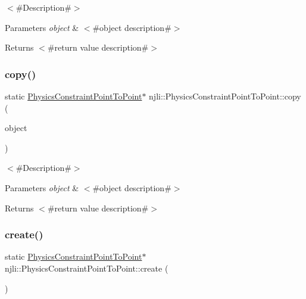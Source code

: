 $<$\#\+Description\#$>$


\begin{DoxyParams}{Parameters}
{\em object} & $<$\#object description\#$>$\\
\hline
\end{DoxyParams}
\begin{DoxyReturn}{Returns}
$<$\#return value description\#$>$ 
\end{DoxyReturn}
\mbox{\label{classnjli_1_1_physics_constraint_point_to_point_abcabf8d381d2c8c7adc66b3ad6a4eb08}} 
\subsubsection{\texorpdfstring{copy()}{copy()}}
{\footnotesize\ttfamily static \mbox{\hyperlink{classnjli_1_1_physics_constraint_point_to_point}{Physics\+Constraint\+Point\+To\+Point}}$\ast$ njli\+::\+Physics\+Constraint\+Point\+To\+Point\+::copy (\begin{DoxyParamCaption}\item[{const \mbox{\hyperlink{classnjli_1_1_physics_constraint_point_to_point}{Physics\+Constraint\+Point\+To\+Point}} \&}]{object }\end{DoxyParamCaption})\hspace{0.3cm}{\ttfamily [static]}}

$<$\#\+Description\#$>$


\begin{DoxyParams}{Parameters}
{\em object} & $<$\#object description\#$>$\\
\hline
\end{DoxyParams}
\begin{DoxyReturn}{Returns}
$<$\#return value description\#$>$ 
\end{DoxyReturn}
\mbox{\label{classnjli_1_1_physics_constraint_point_to_point_a76dd0450878d6b069bf8533024255a6e}} 
\subsubsection{\texorpdfstring{create()}{create()}\hspace{0.1cm}{\footnotesize\ttfamily [1/2]}}
{\footnotesize\ttfamily static \mbox{\hyperlink{classnjli_1_1_physics_constraint_point_to_point}{Physics\+Constraint\+Point\+To\+Point}}$\ast$ njli\+::\+Physics\+Constraint\+Point\+To\+Point\+::create (\begin{DoxyParamCaption}{ }\end{DoxyParamCaption})\hspace{0.3cm}{\ttfamily [static]}}

